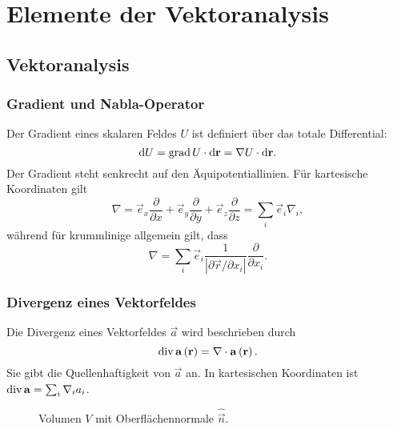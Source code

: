 

\chapter{Elemente der Vektoranalysis\label{elemente_der_vektoranalysis}}

\section{Vektoranalysis}

\subsection{Gradient und Nabla-Operator}

Der Gradient eines skalaren Feldes $U$ ist definiert über das totale Differential:
\begin{equation*}
	\mathop{}\!\mathrm{d} U=\operatorname{grad} U\cdot \mathop{}\!\mathrm{d} \mathbf{r}=\nabla U\cdot \mathop{}\!\mathrm{d} \mathbf{r}.
\end{equation*}
Der Gradient steht senkrecht auf den Äquipotentiallinien. Für kartesische Koordinaten gilt
\begin{equation*}
	\nabla =\vec {e}_{x}\frac{\partial }{\partial x}+\vec {e}_{y}\frac{\partial }{\partial y}+\vec {e}_{z}\frac{\partial }{\partial z}=\sum _{i}\vec {e}_{i}\nabla _{i},
\end{equation*}
während für krummlinige allgemein gilt, dass
\begin{equation*}
	\nabla =\sum _{i}\vec {e}_{i}\frac{1}{\left| \partial \vec {r}/\partial x_{i}\right| }\frac{\partial }{\partial x_{i}}.
\end{equation*}
\subsection{Divergenz eines Vektorfeldes\label{ref-007}}

Die Divergenz eines Vektorfeldes $\vec {a}$ wird beschrieben durch
\begin{equation*}
	\operatorname{div} \mathbf{a}\left(\mathbf{r}\right)=\nabla \cdot \mathbf{a}\left(\mathbf{r}\right).
\end{equation*}
Sie gibt die Quellenhaftigkeit von $\vec {a}$ an. In kartesischen Koordinaten ist $\operatorname{div} \mathbf{a}=\sum _{i}\nabla _{i}a_{i}$.



\begin{figure}[htb]
	\centering
	\tfigCubeWithNormal
	\caption{Volumen $V$ mit Oberflächennormale $\hat{\vec{n}}$. }
	\label{fig:volume_with_normal}
\end{figure}

